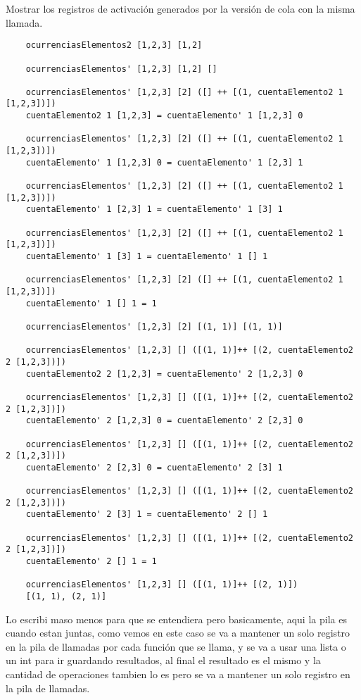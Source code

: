 Mostrar los registros de activación generados por la versión 
de cola con la misma llamada.

\begin{verbatim}
    ocurrenciasElementos2 [1,2,3] [1,2]

    ocurrenciasElementos' [1,2,3] [1,2] []

    ocurrenciasElementos' [1,2,3] [2] ([] ++ [(1, cuentaElemento2 1 [1,2,3])])
    cuentaElemento2 1 [1,2,3] = cuentaElemento' 1 [1,2,3] 0

    ocurrenciasElementos' [1,2,3] [2] ([] ++ [(1, cuentaElemento2 1 [1,2,3])])
    cuentaElemento' 1 [1,2,3] 0 = cuentaElemento' 1 [2,3] 1

    ocurrenciasElementos' [1,2,3] [2] ([] ++ [(1, cuentaElemento2 1 [1,2,3])])
    cuentaElemento' 1 [2,3] 1 = cuentaElemento' 1 [3] 1

    ocurrenciasElementos' [1,2,3] [2] ([] ++ [(1, cuentaElemento2 1 [1,2,3])])
    cuentaElemento' 1 [3] 1 = cuentaElemento' 1 [] 1

    ocurrenciasElementos' [1,2,3] [2] ([] ++ [(1, cuentaElemento2 1 [1,2,3])])
    cuentaElemento' 1 [] 1 = 1

    ocurrenciasElementos' [1,2,3] [2] [(1, 1)] [(1, 1)]
    
    ocurrenciasElementos' [1,2,3] [] ([(1, 1)]++ [(2, cuentaElemento2 2 [1,2,3])]) 
    cuentaElemento2 2 [1,2,3] = cuentaElemento' 2 [1,2,3] 0

    ocurrenciasElementos' [1,2,3] [] ([(1, 1)]++ [(2, cuentaElemento2 2 [1,2,3])])
    cuentaElemento' 2 [1,2,3] 0 = cuentaElemento' 2 [2,3] 0

    ocurrenciasElementos' [1,2,3] [] ([(1, 1)]++ [(2, cuentaElemento2 2 [1,2,3])])
    cuentaElemento' 2 [2,3] 0 = cuentaElemento' 2 [3] 1

    ocurrenciasElementos' [1,2,3] [] ([(1, 1)]++ [(2, cuentaElemento2 2 [1,2,3])])
    cuentaElemento' 2 [3] 1 = cuentaElemento' 2 [] 1

    ocurrenciasElementos' [1,2,3] [] ([(1, 1)]++ [(2, cuentaElemento2 2 [1,2,3])])
    cuentaElemento' 2 [] 1 = 1

    ocurrenciasElementos' [1,2,3] [] ([(1, 1)]++ [(2, 1)])
    [(1, 1), (2, 1)]

\end{verbatim}

Lo escribi maso menos para que se entendiera pero basicamente,
aqui la pila es cuando estan juntas, como vemos en este caso
se va a mantener un solo registro en la pila de llamadas por 
cada función que se llama, y se va a usar una lista o un int
para ir guardando resultados, al final el resultado es el mismo
y la cantidad de operaciones tambien lo es pero se va a mantener
un solo registro en la pila de llamadas.